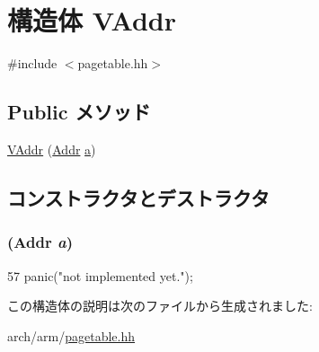 \hypertarget{structArmISA_1_1VAddr}{
\section{構造体 VAddr}
\label{structArmISA_1_1VAddr}
}


{\ttfamily \#include $<$pagetable.hh$>$}\subsection*{Public メソッド}
\begin{DoxyCompactItemize}
\item 
\hyperlink{structArmISA_1_1VAddr_aea4be566b2249d0b69dcee270c8b461d}{VAddr} (\hyperlink{classm5_1_1params_1_1Addr}{Addr} \hyperlink{namespaceArmISA_a468da4d7330577ee8746df2acfa40959}{a})
\end{DoxyCompactItemize}


\subsection{コンストラクタとデストラクタ}
\hypertarget{structArmISA_1_1VAddr_aea4be566b2249d0b69dcee270c8b461d}{
\subsubsection[{VAddr}]{ ({\bf Addr} {\em a})}}
\label{structArmISA_1_1VAddr_aea4be566b2249d0b69dcee270c8b461d}



\begin{DoxyCode}
57 { panic("not implemented yet."); }
\end{DoxyCode}


この構造体の説明は次のファイルから生成されました:\begin{DoxyCompactItemize}
\item 
arch/arm/\hyperlink{arm_2pagetable_8hh}{pagetable.hh}\end{DoxyCompactItemize}
